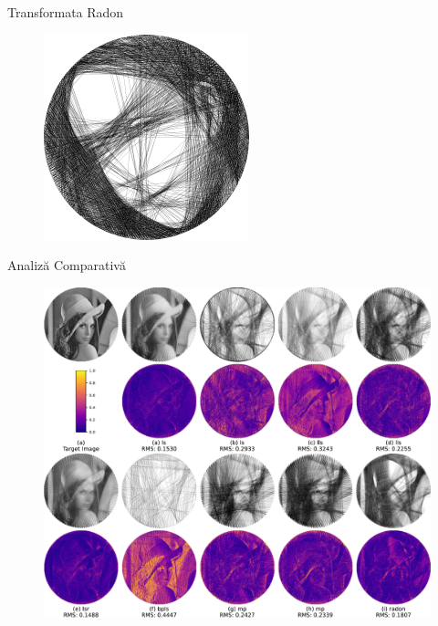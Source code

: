 \documentclass[aspectratio=169,xcolor=dvipsnames]{beamer}
\begin{document}
\begin{frame}{Transformata Radon}
\begin{figure}[H]
\begin{minipage}{0.2\linewidth}
        \end{minipage}
    \hspace{0.02\linewidth}
        \begin{minipage}{0.2\linewidth}
            \centering
            \includegraphics[width=\linewidth]{images/mary_radon.png}
        \end{minipage}
\end{figure}
\end{frame}

\begin{frame}{Analiză Comparativă}
    \begin{figure}
        \includegraphics[width=0.6\linewidth]{images/diff_images.pdf}
    \end{figure}
\end{frame}
\end{document}
